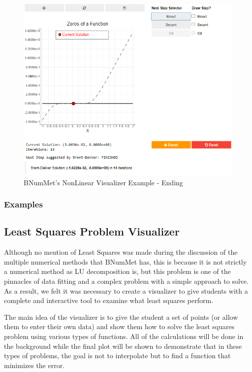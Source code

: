 \begin{figure}[H]
    \centering
    \includegraphics[width=\textwidth]{Include/Images/Thesis/Development/Visualizers/NON LINEAR VISUALIZER/BNumMet.NonLinear.Ex1.2.png}
    \caption{BNumMet's NonLinear Visualizer Example - Ending }
    \label{fig:BNumMet's NonLinear Visualizer Example - Ending }
\end{figure}
\subsubsection{Examples}
	


\subsection{Least Squares Problem Visualizer}
Although no mention of Least Squares was made during the discussion of the multiple numerical methods that BNumMet has, this is because it is not strictly a numerical method as LU decomposition is, but this problem is one of the pinnacles of data fitting and a complex problem with a simple approach to solve. As a result, we felt it was necessary to create a visualizer to give students with a complete and interactive tool to examine what least squares perform.

The main idea of the visualizer is to give the student a set of points (or allow them to enter their own data) and show them how to solve the least squares problem using various types of functions. All of the calculations will be done in the background while the final plot will be shown to demonstrate that in these types of problems, the goal is not to interpolate but to find a function that minimizes the error.

